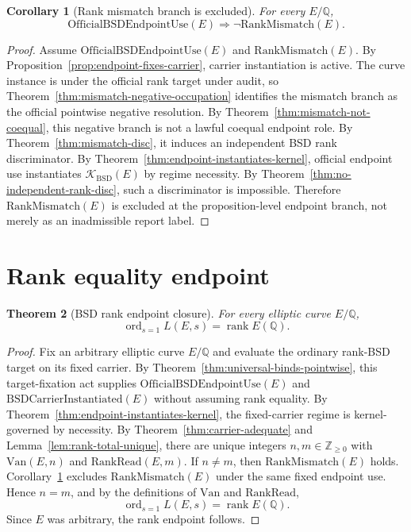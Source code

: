 \documentclass[11pt]{article}
\newtheorem{theorem}{Theorem}[section]
\newtheorem{corollary}[theorem]{Corollary}
\newcommand{\Q}{\mathbb{Q}}
\newcommand{\Z}{\mathbb{Z}}
\newcommand{\rank}{\operatorname{rank}}
\newcommand{\ord}{\operatorname{ord}}
\newcommand{\BSD}{\mathrm{BSD}}
\newcommand{\Van}{\mathrm{Van}}
\newcommand{\RankRead}{\mathrm{RankRead}}
\newcommand{\RankMismatch}{\mathrm{RankMismatch}}
\newcommand{\Kern}{\mathcal{K}}
\begin{document}
\begin{corollary}[Rank mismatch branch is excluded]\label{cor:rank-mismatch-excluded}
For every $E/\Q$,
\[
\mathrm{OfficialBSDEndpointUse}(E)\Rightarrow \neg\RankMismatch(E).
\]
\end{corollary}

\begin{proof}
Assume $\mathrm{OfficialBSDEndpointUse}(E)$ and $\RankMismatch(E)$. By Proposition~\ref{prop:endpoint-fixes-carrier}, carrier instantiation is active. The curve instance is under the official rank target under audit, so Theorem~\ref{thm:mismatch-negative-occupation} identifies the mismatch branch as the official pointwise negative resolution. By Theorem~\ref{thm:mismatch-not-coequal}, this negative branch is not a lawful coequal endpoint role. By Theorem~\ref{thm:mismatch-disc}, it induces an independent BSD rank discriminator. By Theorem~\ref{thm:endpoint-instantiates-kernel}, official endpoint use instantiates $\Kern_{\BSD}(E)$ by regime necessity. By Theorem~\ref{thm:no-independent-rank-disc}, such a discriminator is impossible. Therefore $\RankMismatch(E)$ is excluded at the proposition-level endpoint branch, not merely as an inadmissible report label.
\end{proof}

\section{Rank equality endpoint}

\begin{theorem}[BSD rank endpoint closure]\label{thm:rank-endpoint}
For every elliptic curve $E/\Q$,
\[
\ord_{s=1}L(E,s)=\rank E(\Q).
\]
\end{theorem}

\begin{proof}
Fix an arbitrary elliptic curve $E/\Q$ and evaluate the ordinary rank-BSD target on its fixed carrier. By Theorem~\ref{thm:universal-binds-pointwise}, this target-fixation act supplies $\mathrm{OfficialBSDEndpointUse}(E)$ and $\mathrm{BSDCarrierInstantiated}(E)$ without assuming rank equality. By Theorem~\ref{thm:endpoint-instantiates-kernel}, the fixed-carrier regime is kernel-governed by necessity. By Theorem~\ref{thm:carrier-adequate} and Lemma~\ref{lem:rank-total-unique}, there are unique integers $n,m\in\Z_{\ge0}$ with $\Van(E,n)$ and $\RankRead(E,m)$. If $n\neq m$, then $\RankMismatch(E)$ holds. Corollary~\ref{cor:rank-mismatch-excluded} excludes $\RankMismatch(E)$ under the same fixed endpoint use. Hence $n=m$, and by the definitions of $\Van$ and $\RankRead$,
\[
\ord_{s=1}L(E,s)=\rank E(\Q).
\]
Since $E$ was arbitrary, the rank endpoint follows.
\end{proof}
\end{document}
